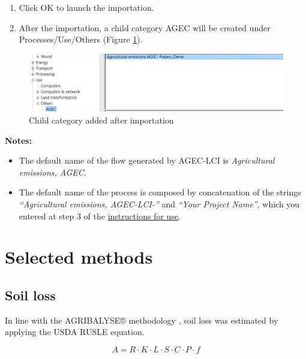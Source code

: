\documentclass[openany]{book}
\begin{document}
\begin{enumerate}
\def\labelenumi{\arabic{enumi}.}
\setcounter{enumi}{4}
\item
  Click OK to launch the importation.
\item
  After the importation, a child category AGEC will be created under Processes/Use/Others (Figure \ref{fig:simapro-step2}).
\end{enumerate}

\begin{figure}[ht]

{\centering \includegraphics[width=0.85\linewidth]{Figures/simapro_step2} 

}

\caption{Child category added after importation}\label{fig:simapro-step2}
\end{figure}

\textbf{Notes:}

\begin{itemize}
\item
  The default name of the flow generated by AGEC-LCI is \emph{Agricultural emissions, AGEC}.
\item
  The default name of the process is composed by concatenation of the strings \emph{``Agricultural emissions, AGEC-LCI-''} and \emph{``Your Project Name''}, which you entered at step 3 of the \protect\hyperlink{instructions}{instructions for use}.
\end{itemize}

\hypertarget{selected-methods}{%
\chapter{Selected methods}\label{selected-methods}}

\hypertarget{soil-loss}{%
\section{Soil loss}\label{soil-loss}}

In line with the AGRIBALYSE® methodology \citep{Koch2015}, soil loss was estimated by applying the USDA RUSLE equation.

\[A = R\cdot K \cdot L \cdot S \cdot C \cdot P \cdot f\]
\end{document}

